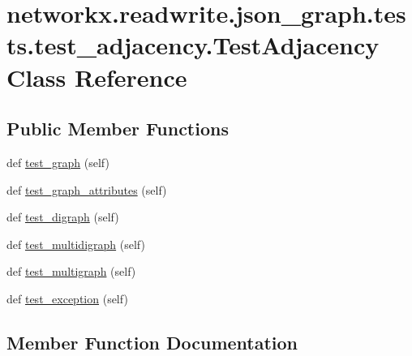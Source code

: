 \hypertarget{classnetworkx_1_1readwrite_1_1json__graph_1_1tests_1_1test__adjacency_1_1TestAdjacency}{}\section{networkx.\+readwrite.\+json\+\_\+graph.\+tests.\+test\+\_\+adjacency.\+Test\+Adjacency Class Reference}
\label{classnetworkx_1_1readwrite_1_1json__graph_1_1tests_1_1test__adjacency_1_1TestAdjacency}
\subsection*{Public Member Functions}
\begin{DoxyCompactItemize}
\item 
def \hyperlink{classnetworkx_1_1readwrite_1_1json__graph_1_1tests_1_1test__adjacency_1_1TestAdjacency_a8b24772d0f93c2d96ed52ac8a64d1767}{test\+\_\+graph} (self)
\item 
def \hyperlink{classnetworkx_1_1readwrite_1_1json__graph_1_1tests_1_1test__adjacency_1_1TestAdjacency_ac269cc8563c6ce3e289aa6dedc2e3582}{test\+\_\+graph\+\_\+attributes} (self)
\item 
def \hyperlink{classnetworkx_1_1readwrite_1_1json__graph_1_1tests_1_1test__adjacency_1_1TestAdjacency_a6d268d06beaa783898d308eb64aa64f9}{test\+\_\+digraph} (self)
\item 
def \hyperlink{classnetworkx_1_1readwrite_1_1json__graph_1_1tests_1_1test__adjacency_1_1TestAdjacency_ad4b32f714d1a336ccb0290c723061178}{test\+\_\+multidigraph} (self)
\item 
def \hyperlink{classnetworkx_1_1readwrite_1_1json__graph_1_1tests_1_1test__adjacency_1_1TestAdjacency_a5c5b53f89039817393d881ecd5344c9b}{test\+\_\+multigraph} (self)
\item 
def \hyperlink{classnetworkx_1_1readwrite_1_1json__graph_1_1tests_1_1test__adjacency_1_1TestAdjacency_aa90e5650a1aa66b5a1c35596d23734e7}{test\+\_\+exception} (self)
\end{DoxyCompactItemize}


\subsection{Member Function Documentation}
\mbox{\label{classnetworkx_1_1readwrite_1_1json__graph_1_1tests_1_1test__adjacency_1_1TestAdjacency_a6d268d06beaa783898d308eb64aa64f9}} 
